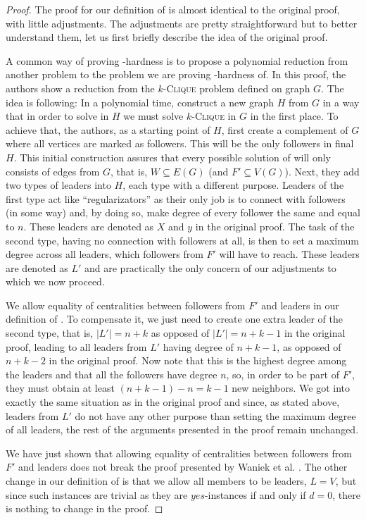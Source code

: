 \begin{proof}
    The proof for our definition of \HL is almost identical to the original proof, with little adjustments.
    The adjustments are pretty straightforward but to better understand them,
    let us first briefly describe the idea of the original proof.

    A common way of proving \NP-hardness is to propose a polynomial reduction from another \NPh problem to the
    problem we are proving \NP-hardness of.
    In this proof, the authors show a reduction from the $k$-\textsc{Clique} problem defined on graph $G$.
    The idea is following: In a polynomial time, construct a new graph $H$ from $G$ in a way that
    in order to solve \HL in $H$ we must solve $k$-\textsc{Clique} in $G$ in the first place.
    To achieve that, the authors, as a starting point of $H$, first create a complement of $G$ 
    where all vertices are marked as followers. This will be the only followers in final $H$.
    This initial construction assures that every possible solution of \HLshort will only consists of edges from $G$, that is,
    $W \subseteq E(G)$ (and $F' \subseteq V(G)$).
    Next, they add two types of leaders into $H$, each type with a different purpose.
    Leaders of the first type act like ``regularizators'' as their only job is to connect with followers (in some way) and,
    by doing so, make degree of every follower the same and equal to $n$.
    These leaders are denoted as $X$ and $y$ in the original proof.
    The task of the second type, having no connection with followers at all,
    is then to set a maximum degree across all leaders, which followers from $F'$ will have to reach.
    These leaders are denoted as $L'$ and are practically the only concern of our adjustments to which we now proceed.

    We allow equality of centralities between followers from $F'$ and leaders in our definition of \HL.
    To compensate it, we just need to create one extra leader of the second type, that is,
    $|L'| = n+k$ as opposed of $|L'| = n+k-1$ in the original proof,
    leading to all leaders from $L'$ having degree of $n+k-1$, as opposed of $n+k-2$ in the original proof.
    Now note that this is the highest degree among the leaders and that all the followers have degree $n$,
    so, in order to be part of $F'$, they must obtain at least $(n+k-1) - n = k-1$ new neighbors.
    We got into exactly the same situation as in the original proof and since, as stated above,
    leaders from $L'$ do not have any other purpose than setting the maximum degree of all leaders,
    the rest of the arguments presented in the proof remain unchanged.

    We have just shown that allowing equality of centralities between followers from $F'$ and leaders does not
    break the proof presented by Waniek et al. \cite{Waniek2017}.
    The other change in our definition of \HL is that we allow all members to be leaders, $L = V$,
    but since such instances are trivial as they are $yes$-instances if and only if $d = 0$,
    there is nothing to change in the proof.
\end{proof}


